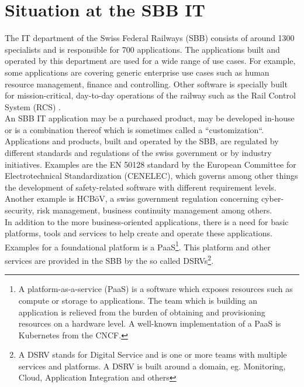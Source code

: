 \documentclass[a4paper,12pt]{article}
\begin{document}
    \section{Situation at the SBB IT}
    \label{sec:sbbit}
    The IT department of the Swiss Federal Railways (SBB) consists of around 1300 specialists and is responsible for
    700 applications\parencite{sbbitkennzahlen}.
    The applications built and operated by this department are used for a wide range of use cases.
    For example, some applications are covering generic enterprise use cases such as human resource management, finance
    and controlling.
    Other software is specially built for mission-critical, day-to-day operations of the railway such as the Rail Control
    System (RCS)\parencite{sbbrcs} .\\
    An SBB IT application may be a purchased product, may be developed in-house or is a combination thereof which is
    sometimes called a ``customization``.\\
    Applications and products, built and operated by the SBB, are regulated by different standards and regulations of the
    swiss government or by industry initiatives.
    Examples are the EN 50128 standard by the European Committee for Electrotechnical Standardization (CENELEC)\parencite{cenelec},
    which governs among other things the development of safety-related software with different requirement levels.
    Another example is HCBöV\parencite{hcboev}, a swiss government regulation concerning cyber-security, risk management,
    business continuity management among others.\\
    In addition to the more business-oriented applications, there is a need for basic platforms, tools and services to help create
    and operate these applications.
    Examples for a foundational platform is a PaaS\footnote{A platform-as-a-service (PaaS) is a software which exposes
    resources such as compute or storage to applications. The team which is building an application is relieved from the
    burden of obtaining and provisioning resources on a hardware level. A well-known implementation of a PaaS is Kubernetes from the CNCF.}.
    This platform and other services are provided in the SBB by the so called DSRVs\footnote{
        A DSRV stands for Digital Service and is one or more teams with multiple services and platforms. A DSRV is built
        around a domain, eg. Monitoring, Cloud, Application Integration and others}.
\end{document}
